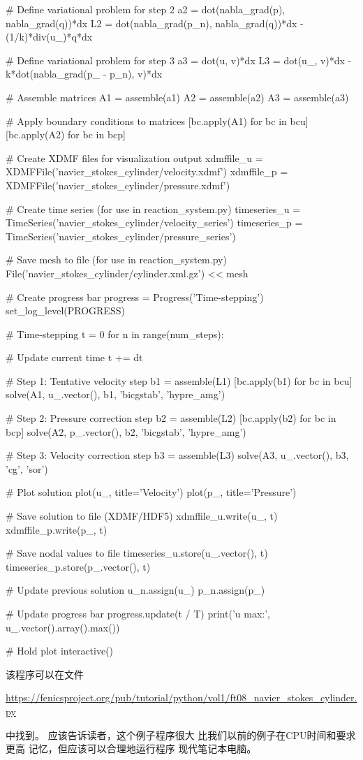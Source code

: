 \begin{python}
# Define variational problem for step 2
a2 = dot(nabla_grad(p), nabla_grad(q))*dx
L2 = dot(nabla_grad(p_n), nabla_grad(q))*dx - (1/k)*div(u_)*q*dx

# Define variational problem for step 3
a3 = dot(u, v)*dx
L3 = dot(u_, v)*dx - k*dot(nabla_grad(p_ - p_n), v)*dx

# Assemble matrices
A1 = assemble(a1)
A2 = assemble(a2)
A3 = assemble(a3)

# Apply boundary conditions to matrices
[bc.apply(A1) for bc in bcu]
[bc.apply(A2) for bc in bcp]

# Create XDMF files for visualization output
xdmffile_u = XDMFFile('navier_stokes_cylinder/velocity.xdmf')
xdmffile_p = XDMFFile('navier_stokes_cylinder/pressure.xdmf')

# Create time series (for use in reaction_system.py)
timeseries_u = TimeSeries('navier_stokes_cylinder/velocity_series')
timeseries_p = TimeSeries('navier_stokes_cylinder/pressure_series')

# Save mesh to file (for use in reaction_system.py)
File('navier_stokes_cylinder/cylinder.xml.gz') << mesh

# Create progress bar
progress = Progress('Time-stepping')
set_log_level(PROGRESS)

# Time-stepping
t = 0
for n in range(num_steps):

    # Update current time
    t += dt

    # Step 1: Tentative velocity step
    b1 = assemble(L1)
    [bc.apply(b1) for bc in bcu]
    solve(A1, u_.vector(), b1, 'bicgstab', 'hypre_amg')

    # Step 2: Pressure correction step
    b2 = assemble(L2)
    [bc.apply(b2) for bc in bcp]
    solve(A2, p_.vector(), b2, 'bicgstab', 'hypre_amg')

    # Step 3: Velocity correction step
    b3 = assemble(L3)
    solve(A3, u_.vector(), b3, 'cg', 'sor')

    # Plot solution
    plot(u_, title='Velocity')
    plot(p_, title='Pressure')

    # Save solution to file (XDMF/HDF5)
    xdmffile_u.write(u_, t)
    xdmffile_p.write(p_, t)

    # Save nodal values to file
    timeseries_u.store(u_.vector(), t)
    timeseries_p.store(p_.vector(), t)

    # Update previous solution
    u_n.assign(u_)
    p_n.assign(p_)

    # Update progress bar
    progress.update(t / T)
    print('u max:', u_.vector().array().max())

# Hold plot
interactive()
\end{python}
该程序可以在文件
\begin{center}
\url{https://fenicsproject.org/pub/tutorial/python/vol1/ft08_navier_stokes_cylinder.py}
\end{center}
中找到。
应该告诉读者，这个例子程序很大
比我们以前的例子在CPU时间和要求更高
记忆，但应该可以合理地运行程序
现代笔记本电脑。

